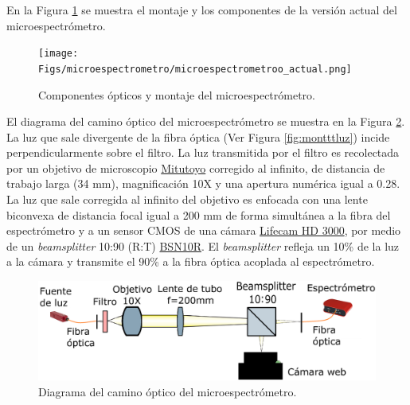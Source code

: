 \hspace{0.5cm}En la Figura \ref{fig:micromfinal} se muestra el montaje y los componentes de la versión actual del microespectrómetro. 
\begin{figure}[H]
	\centering
	\texttt{[image: Figs/microespectrometro/microespectrometroo\_actual.png]}
	\caption{Componentes ópticos y montaje del microespectrómetro.}
	\label{fig:micromfinal}
\end{figure}
El diagrama del camino óptico del microespectrómetro se muestra en la Figura \ref{fig:diagcaminoopt}. La luz que sale divergente de la fibra óptica (Ver Figura \ref{fig:montttluz}) incide perpendicularmente sobre el filtro. La luz transmitida por el filtro es recolectada por un objetivo de microscopio \href{https://www.edmundoptics.com/p/10x-mitutoyo-plan-apo-infinity-corrected-long-wd-objective/6623/}{Mitutoyo} corregido al infinito, de distancia de trabajo larga (34 mm), magnificación 10X y una apertura numérica igual a 0.28. La luz que sale corregida al infinito del objetivo es enfocada con una lente biconvexa de distancia focal igual a 200 mm de forma simultánea a la fibra del espectrómetro y a un sensor CMOS de una cámara \href{https://www.microsoft.com/accessories/es-xl/d/lifecam-hd-3000}{Lifecam HD 3000}, por medio de un \textit{beamsplitter} 10:90 (R:T) \href{https://www.thorlabs.com/thorproduct.cfm?partnumber=BSN10R}{BSN10R}. El \textit{beamsplitter} refleja un 10\% de la luz a la cámara y transmite el 90\% a la fibra óptica acoplada al espectrómetro. 
\begin{figure}[H]
	\centering
	\includegraphics[width=1.0\textwidth]{Figs/microespectrometro/diagopticosetup.png}
	\caption{Diagrama del camino óptico del microespectrómetro.}
	\label{fig:diagcaminoopt}
\end{figure}

